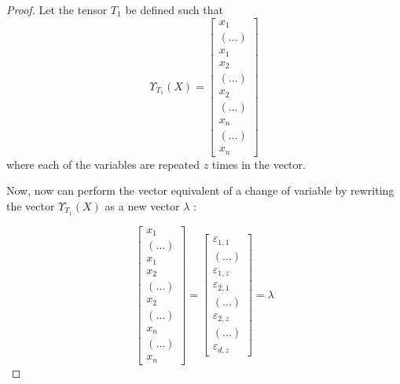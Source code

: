 \documentclass{article}
\theoremstyle{definition}
\theoremstyle{definition}
\begin{document}
\begin{proof}
Let the tensor $T_1$ be defined such that
\begin{equation}
    \Upsilon_{T_1}(X)
    = 
    \begin{bmatrix}
            x_1   \\
            (\dots)  \\
            x_1 \\
            x_2 \\
            (\dots) \\
            x_2 \\
            (\dots) \\
            x_n   \\
            (\dots)  \\
            x_n 
    \end{bmatrix}
\end{equation}
where each of the variables are repeated $z$ times in the vector.

Now, now can perform the vector equivalent of a change of variable by rewriting the vector $\Upsilon_{T_1}(X)$ as a new vector $\lambda$ :

\begin{equation} \label{lambda}
    \begin{bmatrix}
        x_1   \\
        (\dots)  \\
        x_1 \\
        x_2 \\
        (\dots) \\
        x_2 \\
        (\dots) \\
        x_n   \\
        (\dots)  \\
        x_n 
\end{bmatrix}
    =
    \begin{bmatrix}
        \varepsilon_{1, 1} \\
        (\dots) \\
        \varepsilon_{1, z} \\
        \varepsilon_{2, 1} \\
        (\dots) \\
        \varepsilon_{2, z} \\
        (\dots) \\
        \varepsilon_{d, z} 
    \end{bmatrix}
    = \lambda
\end{equation}


\end{proof}
\end{document}
